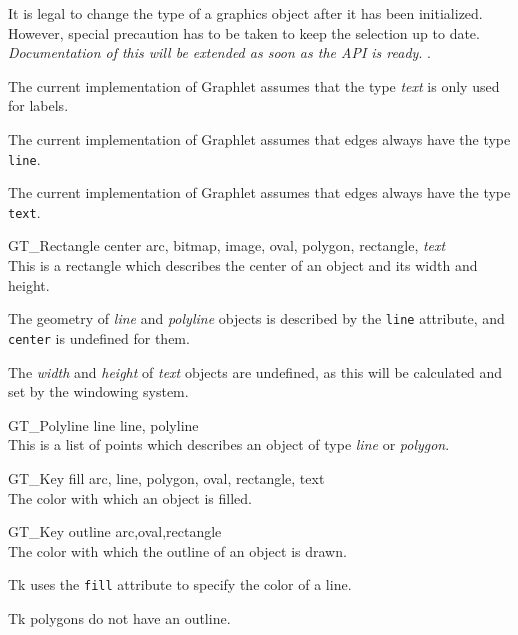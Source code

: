 \documentclass[twoside,fleqn]{report}
\begin{document}
\begin{CAttributes}
  \begin{notes}
    \item It is legal to change the type of a graphics object after it has 
    been initialized.  However, special precaution has to be taken to 
    keep the selection up to date.
    \emph{Documentation of this will be extended as soon as the API is 
      ready}. \ToDo{}.
    \item The current implementation of Graphlet assumes that the type 
    \emph{text} is only used for labels.
    \item The current implementation of Graphlet assumes that
    edges always have the type \texttt{line}.
    \item The current implementation of Graphlet assumes that
    edges always have the type \texttt{text}.
  \end{notes}
  
  \item[GT\_Rectangle center] \hfill
  {\footnotesize arc, bitmap, image, oval, polygon, rectangle, \emph{text}} \\
  This is a rectangle which describes the center of an object and
  its width and height.

  \begin{notes}
    \item
    The geometry of \emph{line} and \emph{polyline} objects is described 
    by the \texttt{line} attribute, and \texttt{center} is undefined for 
    them.
    \item The \emph{width} and \emph{height} of \emph{text} objects
    are undefined, as this will be calculated and set by the
    windowing system.
  \end{notes}
      
  \item[GT\_Polyline line] \hfill
  {\footnotesize line, polyline}\\
  This is a list of points which describes an object of type 
  \emph{line} or \emph{polygon}.

  \item[GT\_Key fill] \hfill
  {\footnotesize arc, line, polygon, oval, rectangle, text} \\
  The color with which an object is filled.
  
  \item[GT\_Key outline] \hfill
  {\footnotesize arc,oval,rectangle} \\
  The color with which the outline of an object is drawn.
  \begin{notes}
  \item Tk uses the \texttt{fill} attribute to specify the color of a 
  line.
  \item Tk polygons do not have an outline.
  \end{notes}


\end{CAttributes}
\end{document}
